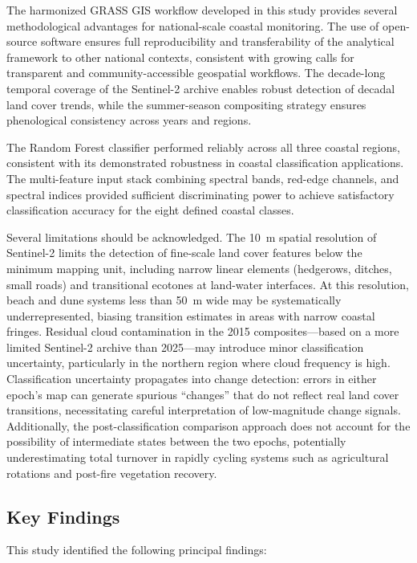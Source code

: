 \documentclass[coasts,article,accept,pdftex,moreauthors]{Definitions/mdpi}
\begin{document}
The harmonized GRASS GIS workflow developed in this study provides several methodological advantages for national-scale coastal monitoring. The use of open-source software ensures full reproducibility and transferability of the analytical framework to other national contexts, consistent with growing calls for transparent and community-accessible geospatial workflows. The decade-long temporal coverage of the Sentinel-2 archive enables robust detection of decadal land cover trends, while the summer-season compositing strategy ensures phenological consistency across years and regions.

The Random Forest classifier performed reliably across all three coastal regions, consistent with its demonstrated robustness in coastal classification applications. The multi-feature input stack combining spectral bands, red-edge channels, and spectral indices provided sufficient discriminating power to achieve satisfactory classification accuracy for the eight defined coastal classes.

Several limitations should be acknowledged. The 10~m spatial resolution of Sentinel-2 limits the detection of fine-scale land cover features below the minimum mapping unit, including narrow linear elements (hedgerows, ditches, small roads) and transitional ecotones at land-water interfaces. At this resolution, beach and dune systems less than 50~m wide may be systematically underrepresented, biasing transition estimates in areas with narrow coastal fringes. Residual cloud contamination in the 2015 composites—based on a more limited Sentinel-2 archive than 2025—may introduce minor classification uncertainty, particularly in the northern region where cloud frequency is high. Classification uncertainty propagates into change detection: errors in either epoch's map can generate spurious ``changes'' that do not reflect real land cover transitions, necessitating careful interpretation of low-magnitude change signals. Additionally, the post-classification comparison approach does not account for the possibility of intermediate states between the two epochs, potentially underestimating total turnover in rapidly cycling systems such as agricultural rotations and post-fire vegetation recovery.

\subsection{{Key Findings}}

This study identified the following principal findings:
\end{document}
